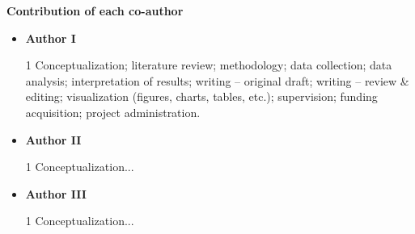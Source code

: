 {\large \textbf{Contribution of each co-author}}
\begin{itemize}
  \item \textbf{Author I}
  \begin{spacing}{1}  \small
  Conceptualization; literature review; methodology; data collection; data analysis; interpretation of results; writing -- original draft; writing -- review \& editing; visualization (figures, charts, tables, etc.); supervision; funding acquisition; project administration.
  \end{spacing}

  \item \textbf{Author II}
      \begin{spacing}{1}  \small
      Conceptualization...
      \end{spacing}

  \item \textbf{Author III}
    \begin{spacing}{1}  \small
    Conceptualization...
    \end{spacing}
\end{itemize}

\newpage
